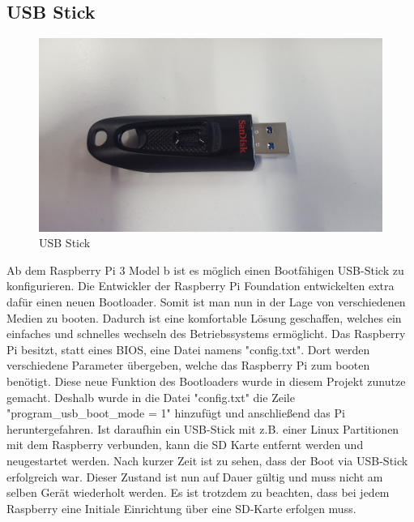 \subsection{USB Stick}
    	\begin{figure}[H]
		\centering
		\includegraphics[width=1.0\textwidth]{images/raspberry_aufbau/UsbStick.jpg}
		\caption{USB Stick}
	\end{figure}  
Ab dem Raspberry Pi 3 Model b ist es möglich einen Bootfähigen USB-Stick zu konfigurieren. Die Entwickler der Raspberry Pi Foundation entwickelten extra dafür einen neuen Bootloader. Somit ist man nun in der Lage von verschiedenen Medien zu booten. Dadurch ist eine komfortable Lösung geschaffen, welches ein einfaches und schnelles wechseln des Betriebssystems ermöglicht. Das Raspberry Pi besitzt, statt eines BIOS, eine Datei namens "config.txt". Dort werden verschiedene Parameter übergeben, welche das Raspberry Pi zum booten benötigt. Diese neue Funktion des Bootloaders wurde in diesem Projekt zunutze gemacht. Deshalb wurde in die Datei "config.txt" die Zeile "program\_usb\_boot\_mode = 1" hinzufügt und anschließend das Pi heruntergefahren. Ist daraufhin ein USB-Stick mit z.B. einer Linux Partitionen mit dem Raspberry verbunden, kann die SD Karte entfernt werden und neugestartet werden. Nach kurzer Zeit ist zu sehen, dass der Boot via USB-Stick erfolgreich war. Dieser Zustand ist nun auf Dauer gültig und muss nicht am selben Gerät wiederholt werden. Es ist trotzdem zu beachten, dass bei jedem Raspberry eine Initiale Einrichtung über eine SD-Karte erfolgen muss.

